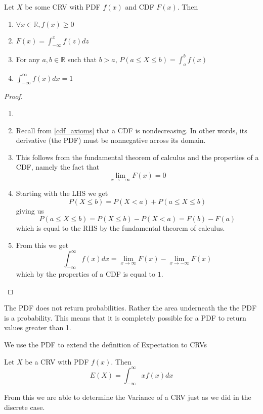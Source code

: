 \documentclass{report}
\begin{document}
\begin{theorem}
    Let $X$ be some CRV with PDF $f(x)$ and CDF $F(x)$. Then
    \begin{enumerate}
        \item $\forall x\in\mathbb R, f(x)\ge 0$
        \item $F(x)=\int_{-\infty}^x f(z)dz$
        \item For any $a,b\in\mathbb R$ such that $b>a$, $P(a\le X\le b)=\int_a^b f(x)$
        \item $\int_{-\infty}^\infty f(x)dx = 1$
    \end{enumerate}
    \begin{proof}
        \begin{enumerate}
            \item[]
            \item Recall from \ref{cdf_axioms} that a CDF is nondecreasing. In other words, its derivative (the PDF) must be nonnegative across its domain.
            \item This follows from the fundamental theorem of calculus and the properties of a CDF, namely the fact that
            \[
                \lim_{x\to-\infty} F(x)=0
            \]
            \item Starting with the LHS we get
            \[
                P(X\le b)=P(X< a)+P(a\le X\le b)
            \]
            giving us
            \[
                P(a\le X\le b)=P(X\le b)-P(X<a)=F(b)-F(a)
            \]
            which is equal to the RHS by the fundamental theorem of calculus.
            \item
            From this we get
            \[
                \int_{-\infty}^\infty f(x)dx = \lim_{x\to \infty} F(x) -\lim_{x\to -\infty} F(x)
            \]
            which by the properties of a CDF is equal to $1$.
        \end{enumerate}
    \end{proof}
\end{theorem}

\begin{notsofast}
    The PDF does not return probabilities. Rather the area underneath the the PDF is a probability. This means that it is completely possible for a PDF to return values greater than 1.
\end{notsofast}

We use the PDF to extend the definition of Expectation to CRVs
\begin{definition}
Let $X$ be a CRV with PDF $f(x)$. Then
    \[
        E(X)=\int_{-\infty}^\infty x f(x) dx
    \]
\end{definition}
From this we are able to determine the Variance of a CRV just as we did in the discrete case.
\end{document}
